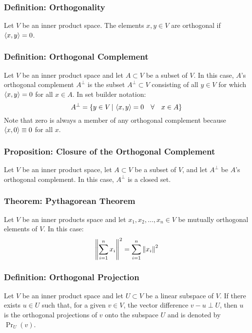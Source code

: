 \documentclass[11pt, a4paper]{article}
\begin{document}
\subsubsection{Definition: Orthogonality}
Let $ V $ be an inner product space. The elements $ x, y \in V$ are orthogonal if $ \expval{x, y} = 0$.

\subsubsection{Definition: Orthogonal Complement}
Let $ V $ be an inner product space and let $ A \subset V$ be a subset of $ V $. In this case, $ A $'s orthogonal complement $ A^{\perp} $ is the subset $ A^{\perp} \subset V $ consisting of all $ y \in V $ for which $  \expval{x, y} = 0  $ for all $ x \in A $. In set builder notation:
\begin{equation*}
	A^{\perp} = \{ y \in V \, | \, \expval{x, y} = 0 \quad \forall \quad x \in A \}
\end{equation*} 
Note that zero is always a member of any orthogonal complement because $ \expval{x, 0} \equiv 0 $ for all $ x $.

\subsubsection{Proposition: Closure of the Orthogonal Complement}
Let $ V $ be an inner product space, let $ A \subset V$ be a subset of $ V $, and let $ A^{\perp} $ be $ A $'s orthogonal complement. In this case, $ A^{\perp} $ is a closed set.

\subsubsection{Theorem: Pythagorean Theorem}
Let $ V $ be an inner products space and let $ x_1, x_2, \dots, x_n \in V $ be mutually orthogonal elements of $ V $. In this case:
\begin{equation*}
	\norm{\sum_{i=1}^{n} x_i }^2 = \sum_{i=1}^{n} \norm{x_i }^2
\end{equation*}

\subsubsection{Definition: Orthogonal Projection}
Let $ V $ be an inner product space and let $ U \subset V $ be a linear subspace of $ V $. If there exists $ u \in U $ such that, for a given $ v \in V $, the vector difference $ v - u \perp U $, then $ u $ is the orthogonal projections of $ v $ onto the subspace $ U $ and is denoted by $ \operatorname{Pr}_{U}(v) $.
\end{document}
